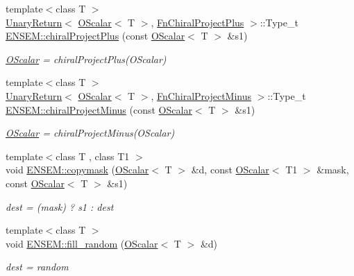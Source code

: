 \begin{DoxyCompactItemize}
{\footnotesize template$<$class T $>$ }\\\mbox{\hyperlink{structENSEM_1_1UnaryReturn}{Unary\+Return}}$<$ \mbox{\hyperlink{classENSEM_1_1OScalar}{O\+Scalar}}$<$ T $>$, \mbox{\hyperlink{structENSEM_1_1FnChiralProjectPlus}{Fn\+Chiral\+Project\+Plus}} $>$\+::Type\+\_\+t \mbox{\hyperlink{group__obsscalar_gad83dc4f2cde27e1d12f3eb6eb672bf87}{E\+N\+S\+E\+M\+::chiral\+Project\+Plus}} (const \mbox{\hyperlink{classENSEM_1_1OScalar}{O\+Scalar}}$<$ T $>$ \&s1)
\begin{DoxyCompactList}\small\item\em \mbox{\hyperlink{classENSEM_1_1OScalar}{O\+Scalar}} = chiral\+Project\+Plus(\+O\+Scalar) \end{DoxyCompactList}\item 
{\footnotesize template$<$class T $>$ }\\\mbox{\hyperlink{structENSEM_1_1UnaryReturn}{Unary\+Return}}$<$ \mbox{\hyperlink{classENSEM_1_1OScalar}{O\+Scalar}}$<$ T $>$, \mbox{\hyperlink{structENSEM_1_1FnChiralProjectMinus}{Fn\+Chiral\+Project\+Minus}} $>$\+::Type\+\_\+t \mbox{\hyperlink{group__obsscalar_ga53162d32552af7a67c288bfa204dce7c}{E\+N\+S\+E\+M\+::chiral\+Project\+Minus}} (const \mbox{\hyperlink{classENSEM_1_1OScalar}{O\+Scalar}}$<$ T $>$ \&s1)
\begin{DoxyCompactList}\small\item\em \mbox{\hyperlink{classENSEM_1_1OScalar}{O\+Scalar}} = chiral\+Project\+Minus(\+O\+Scalar) \end{DoxyCompactList}\item 
{\footnotesize template$<$class T , class T1 $>$ }\\void \mbox{\hyperlink{group__obsscalar_gada3c474cf374d31a9df7c6cba2d608eb}{E\+N\+S\+E\+M\+::copymask}} (\mbox{\hyperlink{classENSEM_1_1OScalar}{O\+Scalar}}$<$ T $>$ \&d, const \mbox{\hyperlink{classENSEM_1_1OScalar}{O\+Scalar}}$<$ T1 $>$ \&mask, const \mbox{\hyperlink{classENSEM_1_1OScalar}{O\+Scalar}}$<$ T $>$ \&s1)
\begin{DoxyCompactList}\small\item\em dest = (mask) ? s1 \+: dest \end{DoxyCompactList}\item 
{\footnotesize template$<$class T $>$ }\\void \mbox{\hyperlink{group__obsscalar_ga8550bbdcfe7af4b27a905b3f89cca5b3}{E\+N\+S\+E\+M\+::fill\+\_\+random}} (\mbox{\hyperlink{classENSEM_1_1OScalar}{O\+Scalar}}$<$ T $>$ \&d)
\begin{DoxyCompactList}\small\item\em dest = random \end{DoxyCompactList}\item 

\end{DoxyCompactItemize}
